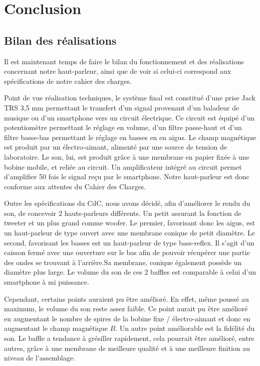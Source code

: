 \chapter{Conclusion}

\section{Bilan des réalisations}

Il est maintenant temps de faire le bilan du fonctionnement et des réalisations concernant notre haut-parleur, ainsi que de voir si celui-ci correspond aux spécifications de notre cahier des charges.

Point de vue réalisation techniques, le système final est constitué d'une prise Jack TRS 3,5 mm permettant le transfert d'un signal provenant d'un baladeur de musique ou d'un smartphone vers un circuit électrique. Ce circuit est équipé d'un potentiomètre permettant le réglage en volume, d'un filtre passe-haut et d'un filtre basse-bas permettant le réglage en basses en en aigus. Le champ magnétique est produit par un électro-aimant, alimenté par une source de tension de laboratoire. Le son, lui, est produit grâce à une membrane en papier fixée à une bobine mobile, et reliée au circuit. Un amplificateur intégré au circuit permet d'amplifier 50 fois le signal reçu par le smartphone. Notre haut-parleur est donc conforme aux attentes du Cahier des Charges.

Outre les spécifications du CdC, nous avons décidé, afin d'améliorer le rendu du son, de concevoir 2 hauts-parleurs différents. Un petit assurant la fonction de tweeter et un plus grand comme woofer. Le premier, favorisant donc les aigus, est un haut-parleur de type ouvert avec une membrane conique de petit diamètre. Le second, favorisant les basses est un haut-parleur de type bass-reflex. Il s'agit d'un caisson fermé avec une ouverture sur le bas afin de pouvoir récupérer une partie des ondes se trouvant à l'arrière.Sa membrane, conique également possède un diamètre plus large. Le volume du son de ces 2 baffles est comparable à celui d'un smartphone à mi puissance.

Cependant, certains points auraient pu être amélioré. En effet, même poussé au maximum, le volume du son reste assez faible. Ce point aurait pu être amélioré en augmentant le nombre de spires de la bobine fixe / électro-aimant et donc en augmentant le champ magnétique $B$. 
Un autre point améliorable est la fidélité du son. Le baffle a tendance à grésiller rapidement, cela pourrait être amélioré, entre autres, grâce à une membrane de meilleure qualité et à une meilleure finition au niveau de l'assemblage.

